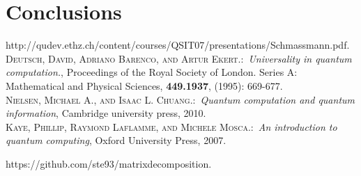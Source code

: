 \documentclass{amsart}
\begin{document}
\section{Conclusions}


\begin{thebibliography}{9}                                                                                                %
http://qudev.ethz.ch/content/courses/QSIT07/presentations/Schmassmann.pdf.\\

 \textsc{Deutsch, David, Adriano Barenco, and Artur Ekert.}:\ \textit{Universality in quantum computation.}, Proceedings of the Royal Society of London. Series A: Mathematical and Physical Sciences, \textbf{449.1937}, (1995): 669-677.\\

 \textsc{Nielsen, Michael A., and Isaac L. Chuang.}:\ \textit{Quantum computation and quantum information}, Cambridge university press, 2010.\\

  \textsc{Kaye, Phillip, Raymond Laflamme, and Michele Mosca.}:\ \textit{An introduction to quantum computing}, Oxford University Press, 2007.

https://github.com/ste93/matrixdecomposition.\\

\end{thebibliography}
\end{document}
